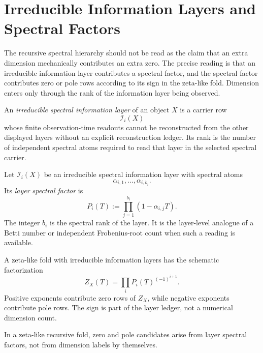 \section{Irreducible Information Layers and Spectral Factors}
\label{sec:unified-reality-irreducible-information-spectral-factor}

The recursive spectral hierarchy should not be read as the claim that an
extra dimension mechanically contributes an extra zero.  The precise
reading is that an irreducible information layer contributes a spectral
factor, and the spectral factor contributes zero or pole rows according
to its sign in the zeta-like fold.  Dimension enters only through the
rank of the information layer being observed.

\begin{definition}
\label{def:unified-reality-irreducible-spectral-information-layer}
An \emph{irreducible spectral information layer} of an object $X$ is a
carrier row
$$
\mathcal I_i(X)
$$
whose finite observation-time readouts cannot be reconstructed from the
other displayed layers without an explicit reconstruction ledger.  Its
rank is the number of independent spectral atoms required to read that
layer in the selected spectral carrier.
\end{definition}

\begin{definition}
\label{def:unified-reality-layer-spectral-factor}
Let $\mathcal I_i(X)$ be an irreducible spectral information layer with
spectral atoms
$$
\alpha_{i,1},\ldots,\alpha_{i,b_i}.
$$
Its \emph{layer spectral factor} is
$$
P_i(T)
:=
\prod_{j=1}^{b_i}(1-\alpha_{i,j}T).
$$
The integer $b_i$ is the spectral rank of the layer.  It is the
layer-level analogue of a Betti number or independent Frobenius-root
count when such a reading is available.
\end{definition}

\begin{definition}
\label{def:unified-reality-alternating-zeta-like-factorization}
A zeta-like fold with irreducible information layers has the schematic
factorization
$$
Z_X(T)
=
\prod_i P_i(T)^{(-1)^{i+1}}.
$$
Positive exponents contribute zero rows of $Z_X$, while negative
exponents contribute pole rows.  The sign is part of the layer ledger,
not a numerical dimension count.
\end{definition}

\begin{theorem}
\label{thm:unified-reality-spectral-factors-from-information-layers}
In a zeta-like recursive fold, zero and pole candidates arise from
layer spectral factors, not from dimension labels by themselves.
\end{theorem}

